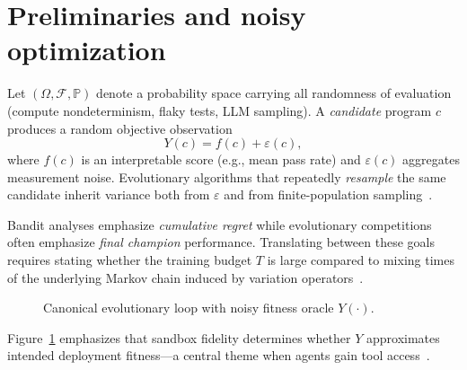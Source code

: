 \section{Preliminaries and noisy optimization}
\label{sec:prelim}

Let $(\Omega,\mathcal{F},\mathbb{P})$ denote a probability space carrying all randomness of evaluation (compute nondeterminism, flaky tests, LLM sampling).
A \emph{candidate} program $c$ produces a random objective observation
\begin{equation}
  Y(c) = f(c) + \varepsilon(c),
\end{equation}
where $f(c)$ is an interpretable score (e.g., mean pass rate) and $\varepsilon(c)$ aggregates measurement noise.
Evolutionary algorithms that repeatedly \emph{resample} the same candidate inherit variance both from $\varepsilon$ and from finite-population sampling~\cite{eiben2015introduction}.

\begin{remark}
Bandit analyses emphasize \emph{cumulative regret} while evolutionary competitions often emphasize \emph{final champion} performance.
Translating between these goals requires stating whether the training budget $T$ is large compared to mixing times of the underlying Markov chain induced by variation operators~\cite{sutton2018reinforcement}.
\end{remark}

\begin{figure}[t]
  \centering
  
  \caption{Canonical evolutionary loop with noisy fitness oracle $Y(\cdot)$.}
  \label{fig:ea-loop}
\end{figure}

Figure~\ref{fig:ea-loop} emphasizes that sandbox fidelity determines whether $Y$ approximates intended deployment fitness---a central theme when agents gain tool access~\cite{zhang2025darwin}.
